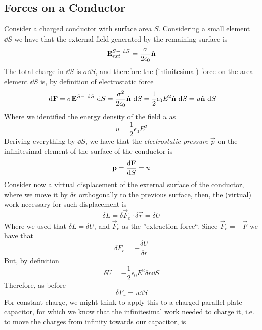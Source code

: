 \documentclass[../electromagnetism]{subfiles}
\begin{document}
\subsection{Forces on a Conductor}
Consider a charged conductor with surface area $S$. Considering a small element $\dd S$ we have that the external field generated by the remaining surface is
\begin{equation*}
	\mathbf{E}_{ext}^{S-\ \mathrm{d} S}=\frac{\sigma}{2\epsilon_0}\hat{\mathbf{n}}
\end{equation*}
The total charge in $\dd S$ is $\sigma\dd S$, and therefore the (infinitesimal) force on the area element $\dd S$ is, by definition of electrostatic force
\begin{equation}
	\ \mathrm{d}\mathbf{F}=\sigma\mathbf{E}^{S-\ \mathrm{d} S}\ \mathrm{d} S=\frac{\sigma^2}{2\epsilon_0}\hat{\mathbf{n}}\ \mathrm{d} S=\frac{1}{2}\epsilon_0E^2\hat{\mathbf{n}}\ \mathrm{d} S=u\hat{\mathbf{n}}\ \mathrm{d} S
	\label{eq:forceonds}
\end{equation}
Where we identified the energy density of the field $u$ as
\begin{equation*}
	u=\frac{1}{2}\epsilon_0E^2
\end{equation*}
Deriving everything by $\dd S$, we have that the \textit{electrostatic pressure} $\vec{p}$ on the infinitesimal element of the surface of the conductor is
\begin{equation}
	\mathbf{p}=\dv{\mathbf{F}}{S}=u
	\label{eq:elpressure}
\end{equation}
Consider now a virtual displacement of the external surface of the conductor, where we move it by $\delta r$ orthogonally to the previous surface, then, the (virtual) work necessary for such displacement is
\begin{equation*}
	\delta L=\delta\vec{F}_e\cdot\delta\vec{r}=\delta U
\end{equation*}
Where we used that $\delta L=\delta U$, and $\vec{F}_e$ as the ''extraction force``. Since $\vec{F}_e=-\vec{F}$ we have that
\begin{equation*}
	\delta F_r=-\frac{\delta U}{\delta r}
\end{equation*}
But, by definition
\begin{equation*}
	\delta U=-\frac{1}{2}\epsilon_0E^2\delta r\dd S
\end{equation*}
Therefore, as before
\begin{equation*}
	\delta F_r=u\dd S
\end{equation*}
For constant charge, we might think to apply this to a charged parallel plate capacitor, for which we know that the infinitesimal work needed to charge it, i.e. to move the charges from infinity towards our capacitor, is
\end{document}

